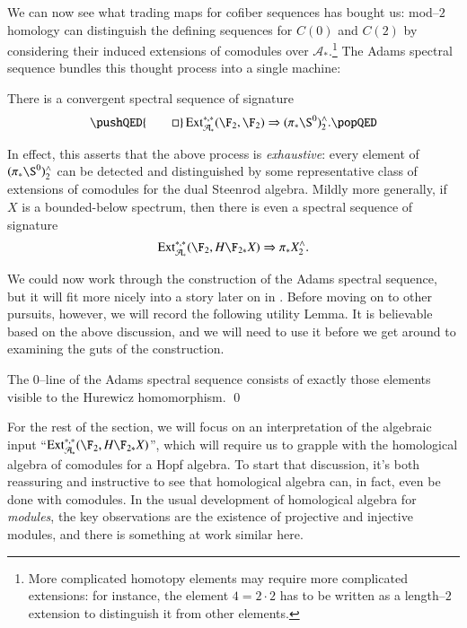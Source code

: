 We can now see what trading maps for cofiber sequences has bought us: mod--$2$ homology can distinguish the defining sequences for $C(0)$ and $C(2)$ by considering their induced extensions of comodules over $\mathcal A_*$.\footnote{More complicated homotopy elements may require more complicated extensions: for instance, the element $4 = 2 \cdot 2$ has to be written as a length--$2$ extension to distinguish it from other elements.}  The Adams spectral sequence bundles this thought process into a single machine:
\begin{theorem}
There is a convergent spectral sequence of signature
\[
\pushQED{\qed}
\Ext_{\mathcal A_*}^{*, *}(\F_2, \F_2) \Rightarrow (\pi_* \S^0)^\wedge_2.\qedhere
\popQED
\]
\end{theorem}
In effect, this asserts that the above process is \emph{exhaustive}: every element of $(\pi_* \S^0)^\wedge_2$ can be detected and distinguished by some representative class of extensions of comodules for the dual Steenrod algebra.  Mildly more generally, if $X$ is a bounded-below spectrum, then there is even a spectral sequence of signature \[\Ext_{\mathcal A_*}^{*, *}(\F_2, H\F_{2*} X) \Rightarrow \pi_* X^\wedge_2.\]

We could now work through the construction of the Adams spectral sequence, but it will fit more nicely into a story later on in .  Before moving on to other pursuits, however, we will record the following utility Lemma.  It is believable based on the above discussion, and we will need to use it before we get around to examining the guts of the construction.
\begin{lemma}\label{HurewiczImageOnZeroLine}
The $0$--line of the Adams spectral sequence consists of exactly those elements visible to the Hurewicz homomorphism. \qed
\end{lemma}

For the rest of the section, we will focus on an interpretation of the algebraic input ``$\Ext_{\mathcal A_*}^{*, *}(\F_2, H\F_{2*} X)$'', which will require us to grapple with the homological algebra of comodules for a Hopf algebra.  To start that discussion, it's both reassuring and instructive to see that homological algebra can, in fact, even be done with comodules.  In the usual development of homological algebra for \emph{modules}, the key observations are the existence of projective and injective modules, and there is something at work similar here.

